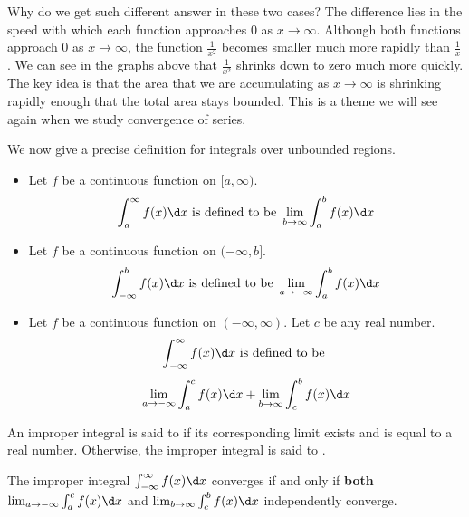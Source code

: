 \documentclass{ximera}
\begin{document}
Why do we get such different answer in these two cases?  The difference lies in the speed with which each function approaches $0$ as $x \to \infty$. Although both functions approach $0$ as $x \to \infty$, the function $\frac{1}{x^2}$ becomes smaller much more rapidly than $\frac{1}{x}$. 
We can see in the graphs above that $\frac{1}{x^2}$ shrinks down to zero much more quickly. The key idea is that the area that we are accumulating as $x\to \infty$ is shrinking rapidly enough that the total area stays bounded. This is a theme we will see again when we study convergence of series. 

We now give a precise definition for integrals over unbounded regions.

\begin{definition}\hfil
\begin{itemize}
\item Let $f$ be a continuous function on $[a,\infty)$.
  \[
  \int_a^\infty f(x) \d x \text{ is defined to be } \lim_{b\to\infty}\int_a^b f(x) \d x
  \]
\item Let $f$ be a continuous function on $(-\infty,b]$.
  \[
  \int_{-\infty}^b f(x) \d x \text{ is defined to be } \lim_{a\to-\infty}\int_a^b f(x) \d x
  \]
\item Let $f$ be a continuous function on $(-\infty,\infty)$. Let $c$
  be any real number.
  \[
  \int_{-\infty}^\infty f(x) \d x \text{ is defined to be }
  \]
  \[
  \lim_{a\to-\infty}\int_a^c f(x) \d x + \lim_{b\to\infty}\int_c^b
  f(x) \d x
  \]
\end{itemize}
An improper integral is said to  if its corresponding
limit exists and is equal to a real number. Otherwise, the improper
integral is said to . 
\end{definition}

\begin{warning}
  The improper integral $  \int_{-\infty}^\infty f(x) \d x$ converges if and only if \textbf{both}  $ \lim_{a\to-\infty}\int_a^c f(x) \d x$
and $  \lim_{b\to\infty}\int_c^b f(x) \d x$
independently converge.
\end{warning}
\end{document}
